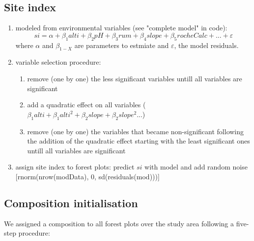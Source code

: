 \documentclass[a4paper]{article}
\begin{document}

\subsection*{Site index}
\begin{enumerate}
    \item modeled from environmental variables (see "complete model" in code):
    \begin{equation}\label{si}
    si = \alpha + \beta_1 alti + \beta_2 pH +\beta_3 rum +\beta_4 slope +\beta_5 rocheCalc+...+\varepsilon \end{equation}
    where $\alpha$ and $\beta_{1-X}$ are parameters to estmiate and $\varepsilon$, the model residuals.
    \item variable selection procedure:
    \begin{enumerate}
        \item remove (one by one) the less significant variables untill all variables are significant
        \item add a quadratic effect on all variables ($\beta_1alti + \beta_1alti^2 + \beta_2slope + \beta_2slope^2...$)
        \item remove (one by one) the variables that became non-significant following the addition of the quadratic effect starting with the least significant ones  untill all variables are significant
\end{enumerate}
    \item assign site index to forest plots: predict $si$ with model and add random noise   [rnorm(nrow(modData), 0, sd(residuals(mod)))]
\end{enumerate}


\subsection*{Composition initialisation}

We assigned a composition to all forest plots over the study area following a five-step procedure:
\end{document}
